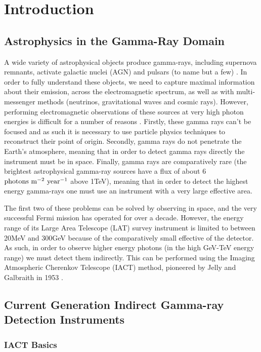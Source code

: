 \chapter{\label{ch:1-intro}Introduction} 
\minitoc
\section{Astrophysics in the Gamma-Ray Domain}
A wide variety of astrophysical objects produce gamma-rays, including supernova remnants, activate galactic nuclei (AGN) and pulsars (to name but a few) \cite{scienceCTA}. In order to fully understand these objects, we need to capture maximal information about their emission, across the electromagnetic spectrum, as well as with multi-messenger methods (neutrinos, gravitational waves and cosmic rays).  However, performing electromagnetic observations of these sources at very high photon energies is difficult for a number of reasons \cite{jamieiact}. Firstly, these gamma rays can't be focused and as such it is necessary to use particle physics techniques to reconstruct their point of origin. Secondly, gamma rays do not penetrate the Earth's atmosphere, meaning that in order to detect gamma rays directly the instrument must be in space. Finally, gamma rays are comparatively rare (the brightest astrophysical gamma-ray sources have a flux of about 6 $\rm{photons} \ \rm{m}^{-2}\ \rm{year}^{-1}$ above 1TeV\cite{jamieiact}), meaning that in order to detect the highest energy gamma-rays one must use an instrument with a very large effective area.

The first two of these problems can be solved by observing in space, and the very successful Fermi mission has operated for over a decade. However, the energy range of its Large Area Telescope (LAT) survey instrument is limited to between 20MeV and 300GeV because of the comparatively small effective of the detector. As such, in order to observe higher energy photons (in the high GeV-TeV energy range) we must detect them indirectly. This can be performed using the Imaging Atmospheric Cherenkov Telescope  (IACT) method, pioneered by Jelly and Galbraith in 1953 \cite{G+J}. 

\section{Current Generation Indirect Gamma-ray Detection Instruments}
\subsection{IACT Basics}

